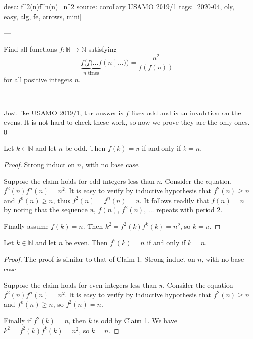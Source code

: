 desc: f^2(n)f^n(n)=n^2
source: corollary USAMO 2019/1
tags: [2020-04, oly, easy, alg, fe, arrows, mini]

---

Find all functions $f:\mathbb N\to\mathbb N$ satisfying \[\underbrace{f(f(\ldots f}_{n\text{ times}}(n)\ldots))=\frac{n^2}{f(f(n))}\]
for all positive integers $n$.

---

Just like USAMO 2019/1, the answer is $f$ fixes odd and is an involution on the evens. It is not hard to check these work, so now we prove they are the only ones.
\setcounter{claim}0
\begin{claim}
    Let $k\in\mathbb N$ and let $n$ be odd. Then $f(k)=n$ if and only if $k=n$.
\end{claim}
\begin{proof}
    Strong induct on $n$, with no base case.

    Suppose the claim holds for odd integers less than $n$. Consider the equation $f^2(n)f^n(n)=n^2$. It is easy to verify by inductive hypothesis that $f^2(n)\ge n$ and $f^n(n)\ge n$, thus $f^2(n)=f^n(n)=n$. It follows readily that $f(n)=n$ by noting that the sequence $n$, $f(n)$, $f^2(n)$, $\ldots$ repeats with period $2$.

    Finally assume $f(k)=n$. Then $k^2=f^2(k)f^k(k)=n^2$, so $k=n$.
\end{proof}
\begin{claim}
    Let $k\in\mathbb N$ and let $n$ be even. Then $f^2(k)=n$ if and only if $k=n$.
\end{claim}
\begin{proof}
    The proof is similar to that of Claim 1. Strong induct on $n$, with no base case.

    Suppose the claim holds for even integers less than $n$. Consider the equation $f^2(n)f^n(n)=n^2$. It is easy to verify by inductive hypothesis that $f^2(n)\ge n$ and $f^n(n)\ge n$, so $f^2(n)=n$.

    Finally if $f^2(k)=n$, then $k$ is odd by Claim 1. We have $k^2=f^2(k)f^k(k)=n^2$, so $k=n$.
\end{proof}

